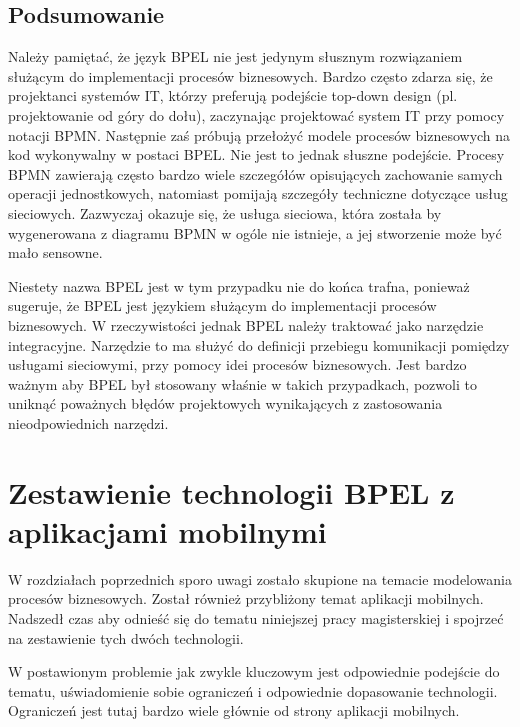 \subsection{Podsumowanie}
\label{sec:bpelSummary}

Należy pamiętać, że język BPEL nie jest jedynym słusznym rozwiązaniem służącym do implementacji procesów biznesowych. Bardzo często  zdarza się, że projektanci systemów IT, którzy preferują podejście top-down design (pl. projektowanie od góry do dołu), zaczynając projektować system IT przy pomocy notacji BPMN. Następnie zaś próbują przełożyć modele procesów biznesowych na kod wykonywalny w postaci BPEL. Nie jest to jednak słuszne podejście. Procesy BPMN zawierają często bardzo wiele szczegółów opisujących zachowanie samych operacji jednostkowych, natomiast pomijają szczegóły techniczne dotyczące usług sieciowych.  Zazwyczaj okazuje się, że usługa sieciowa, która została by wygenerowana z diagramu BPMN w ogóle nie istnieje, a jej stworzenie może być mało sensowne.

Niestety nazwa BPEL jest w tym przypadku nie do końca trafna, ponieważ sugeruje, że BPEL jest językiem służącym do implementacji procesów biznesowych. W rzeczywistości jednak BPEL należy traktować jako narzędzie integracyjne. Narzędzie to ma służyć do definicji przebiegu komunikacji pomiędzy usługami sieciowymi, przy pomocy idei procesów biznesowych. Jest bardzo ważnym aby BPEL był stosowany właśnie w takich przypadkach, pozwoli to uniknąć poważnych błędów projektowych wynikających z zastosowania nieodpowiednich narzędzi.  



\section{Zestawienie technologii BPEL z aplikacjami mobilnymi}
\label{sec:bpelVSmobileApp}

W rozdziałach poprzednich sporo uwagi zostało skupione na temacie modelowania procesów biznesowych. Został również przybliżony temat aplikacji mobilnych. Nadszedł czas aby odnieść się do tematu niniejszej pracy magisterskiej i spojrzeć na zestawienie tych dwóch technologii. 

W postawionym problemie jak zwykle kluczowym jest odpowiednie podejście do tematu, uświadomienie sobie ograniczeń i odpowiednie dopasowanie technologii. Ograniczeń jest tutaj bardzo wiele głównie od strony aplikacji mobilnych.

